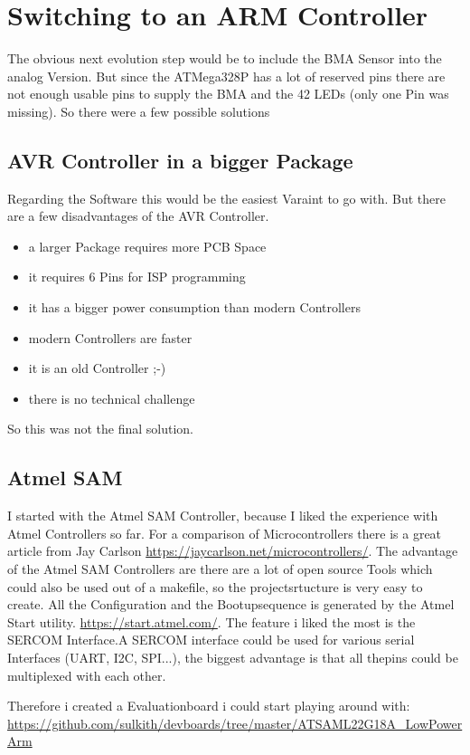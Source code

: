 \section{Switching to an ARM Controller}
The obvious next evolution step would be to include the BMA Sensor into the analog Version. But since the ATMega328P has a lot of reserved pins there are not enough usable pins to supply the BMA and the 42 LEDs (only one Pin was missing). So there were a few possible solutions
\subsection{AVR Controller in a bigger Package}
Regarding the Software this would be the easiest Varaint to go with.
But there are a few disadvantages of the AVR Controller.
\begin{itemize}
	\item a larger Package requires more PCB Space
	\item it requires 6 Pins for ISP programming
	\item it has a bigger power consumption than modern Controllers
	\item modern Controllers are faster
	\item it is an old Controller ;-)
	\item there is no technical challenge 
\end{itemize}
So this was not the final solution.
\subsection{Atmel SAM}
I started with the Atmel SAM Controller, because I liked the experience with Atmel Controllers so far. For a comparison of Microcontrollers there is a great article from Jay Carlson \url{https://jaycarlson.net/microcontrollers/}. The advantage of the Atmel SAM Controllers are there are a lot of open source Tools which could also be used out of a makefile, so the projectsrtucture is very easy to create. All the Configuration and the Bootupsequence is generated by the Atmel Start utility. \url{https://start.atmel.com/}. The feature i liked the most is the SERCOM Interface.A SERCOM interface could be used for various serial Interfaces (UART, I2C, SPI...), the biggest advantage is that all thepins could be multiplexed with each other.

Therefore i created a Evaluationboard i could start playing around with:
\url{https://github.com/sulkith/devboards/tree/master/ATSAML22G18A_LowPowerArm}

